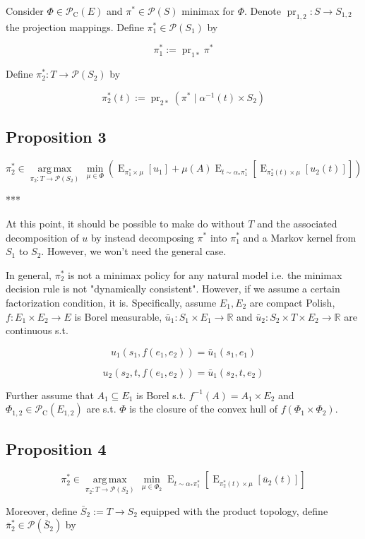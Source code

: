 \documentclass[a4paper]{article}
\DeclareMathOperator{\E}{E}
\DeclareMathOperator{\Prj}{pr}
\newcommand{\Argmax}[1]{\underset{#1}{\operatorname{arg\,max}}\,}
\newcommand{\Reals}{\mathbb{R}}
\newcommand{\Prob}{\mathcal{P}}
\newcommand{\CC}{\mathcal{P}_{\operatorname{C}}}
\begin{document}
Consider ${\Phi \in \CC(E)}$ and ${\pi^* \in \Prob(S)}$ minimax for ${\Phi}$. Denote ${\Prj_{1,2}: S \rightarrow S_{1,2}}$ the projection mappings. Define ${\pi_1^* \in \Prob(S_1)}$ by

$$\pi_1^* := \Prj_{1*}\pi^*$$

Define ${\pi_2^*: T \rightarrow \Prob(S_2)}$ by

$$\pi_2^*(t) := \Prj_{2*} (\pi^* \mid \alpha^{-1}(t) \times S_2)$$

\subsection{Proposition 3}

$$\pi_2^* \in \Argmax{\pi_2: T \rightarrow \Prob(S_2)} \min_{\mu \in \Phi} (\E_{\pi_1^* \times \mu}[u_1] + \mu(A) \E_{t \sim \alpha_*\pi_1^*}[\E_{\pi_2^*(t) \times \mu}[u_2(t)]])$$

***

At this point, it should be possible to make do without ${T}$ and the associated decomposition of ${u}$ by instead decomposing ${\pi^*}$ into ${\pi_1^*}$ and a Markov kernel from ${S_1}$ to ${S_2}$. However, we won't need the general case.

In general, ${\pi_2^*}$ is not a minimax policy for any natural model i.e. the minimax decision rule is not "dynamically consistent". However, if we assume a certain factorization condition, it is. Specifically, assume ${E_1, E_2}$ are compact Polish, ${f: E_1 \times E_2 \rightarrow E}$ is Borel measurable, ${\bar{u}_1: S_1 \times E_1 \rightarrow \Reals}$ and ${\bar{u}_2: S_2 \times T \times E_2 \rightarrow \Reals}$ are continuous s.t. 

$${u_1(s_1,f(e_1,e_2))=\bar{u}_1(s_1,e_1)}$$

$${u_2(s_2,t,f(e_1,e_2))=\bar{u}_1(s_2,t,e_2)}$$

Further assume that ${A_1 \subseteq E_1}$ is Borel s.t. ${f^{-1}(A) = A_1 \times E_2}$ and ${\Phi_{1,2} \in \CC(E_{1,2})}$ are s.t. ${\Phi}$ is the closure of the convex hull of ${f(\Phi_1 \times \Phi_2)}$.

\subsection{Proposition 4}

$$\pi_2^* \in \Argmax{\pi_2: T \rightarrow \Prob(S_2)} \min_{\mu \in \Phi_2} \E_{t \sim \alpha_*\pi_1^*}[\E_{\pi_2^*(t) \times \mu}[\bar{u}_2(t)]]$$

Moreover, define ${\bar{S}_2:=T \rightarrow S_2}$ equipped with the product topology, define ${\bar{\pi}_2^* \in \Prob(\bar{S}_2)}$ by
\end{document}
